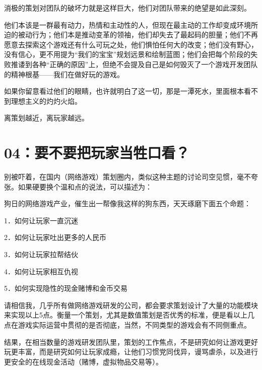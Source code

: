 \documentclass{article}
\begin{document}
消极的策划对团队的破坏力就是这样巨大，他们对团队带来的绝望是如此深刻。



他们本该是一群最有动力，热情和主动性的人，但现在最主动的工作却变成环境所迫的被动行为；他们本是推动变革的领袖，他们却失去了最起码的胆量；他们不再愿意去探索这个游戏还有什么可玩之处，他们惧怕任何大的改变；他们没有野心，没有信心，更不用提为“我们的宝宝”规划远景和绘制蓝图；他们会把每个阶段的失败推诿到各种“正确的原因”上，但绝不会提及自己是如何毁灭了一个游戏开发团队的精神根基——我们在做好玩的游戏。



如果你留意看过他们的眼睛，也许就明白了这一切，那是一潭死水，里面根本看不到理想主义的灼灼火焰。



离策划越近，离玩家越远。





{\centering\section*{04：要不要把玩家当牲口看？}}





别被吓着，在国内（网络游戏）策划圈内，类似这种主题的讨论司空见惯，毫不夸张。如果硬要换个温和点的说法，可以描述为：



狗日的网络游戏产业，催生出一帮像我这样的狗东西，天天琢磨下面五个命题：



1．如何让玩家一直沉迷 



2．如何让玩家吐出更多的人民币 



3．如何让玩家拉帮结伙 



4．如何让玩家相互仇视 



5．如何实现隐性的现金赌博和金币交易



请相信我，几乎所有做网络游戏研发的公司，都会要求策划设计了大量的功能模块来实现以上5点。衡量一个策划，尤其是数值策划是否优秀的标准，便是看以上几点在游戏实际运营中贯彻的是否彻底，当然，不同类型的游戏会有不同侧重点。



结果，在相当数量的游戏研发团队里，策划的工作焦点，不是研究如何让游戏更好玩更丰富，而是研究如何让玩家成瘾，让他们习惯党同伐异，谩骂虐杀，以及进行更安全的在线现金活动（赌博，虚拟物品交易等）。
\end{document}
